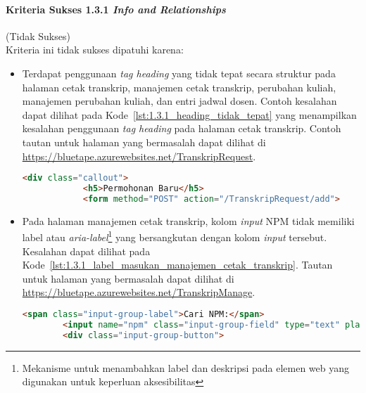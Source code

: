 \paragraph{Kriteria Sukses 1.3.1 \textit{Info and Relationships}}
\label{par:kepatuhan_bluetape_kriteria_sukses_1.3.1}
(Tidak Sukses)\\

Kriteria ini tidak sukses dipatuhi karena:
\begin{itemize}
    \item Terdapat penggunaan \textit{tag heading} yang tidak tepat secara struktur pada halaman cetak transkrip, manajemen cetak transkrip, perubahan kuliah, manajemen perubahan kuliah, dan entri jadwal dosen. Contoh kesalahan dapat dilihat pada \mbox{Kode \ref{lst:1.3.1_heading_tidak_tepat}} yang menampilkan kesalahan penggunaan \textit{tag heading} pada halaman cetak transkrip. Contoh tautan untuk halaman yang bermasalah dapat dilihat di \url{https://bluetape.azurewebsites.net/TranskripRequest}.
    \begin{lstlisting}[frame=single, label={lst:1.3.1_heading_tidak_tepat}, language=HTML, caption=Pelanggaran Kriteria Sukses 1.3.1 pada Halaman Cetak Transkrip]
        <div class="callout">
            <h5>Permohonan Baru</h5>
            <form method="POST" action="/TranskripRequest/add">
    \end{lstlisting}

    \item Pada halaman manajemen cetak transkrip, kolom \textit{input} NPM tidak memiliki label atau \textit{aria-label}\footnote{Mekanisme untuk menambahkan label dan deskripsi pada elemen web yang digunakan untuk keperluan aksesibilitas} yang bersangkutan dengan kolom \textit{input} tersebut. Kesalahan dapat dilihat pada \mbox{Kode \ref{lst:1.3.1_label_masukan_manajemen_cetak_transkrip}}. Tautan untuk halaman yang bermasalah dapat dilihat di \url{https://bluetape.azurewebsites.net/TranskripManage}.
    \begin{lstlisting}[frame=single, label={lst:1.3.1_label_masukan_manajemen_cetak_transkrip}, language=HTML, caption=Pelanggaran Kriteria Sukses 1.3.1 pada Halaman Manajemen Cetak Transkrip]
        <span class="input-group-label">Cari NPM:</span>
        <input name="npm" class="input-group-field" type="text" placeholder="2013730013" maxlength="10" minlength="10"/>
        <div class="input-group-button">
    \end{lstlisting}


\end{itemize}
